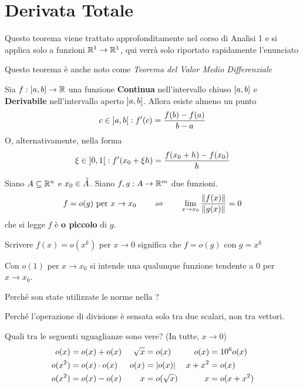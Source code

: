 \section{Derivata Totale}
\begin{theorem}[di Lagrange]\leavevmode\vspace*{-\baselineskip}
	\label{teo:lagrange}
	\begin{note}
		Questo teorema viene trattato approfonditamente nel corso di Analisi 1 e si applica solo a funzioni $\mathbb{R}^1 \to \mathbb{R}^1$, qui verrà solo riportato rapidamente l'enunciato
	\end{note}
	\begin{note}
		Questo teorema è anche noto come \textit{Teorema del Valor Medio Differenziale}
	\end{note}
	Sia $f: \left[a,b\right] \to \mathbb{R}$ una funzione \textbf{Continua} nell'intervallo chiuso $\left[a,b\right]$ e \textbf{Derivabile} nell'intervallo aperto $\left]a,b\right[$. Allora esiste almeno un punto
	\[c \in \left]a,b\right[ : f'(c) = \frac{f(b)-f(a)}{b - a}\]
	O, alternativamente, nella forma
	\[\xi \in \left]0,1\right[ : f'(x_0 + \xi h) = \frac{f(x_0 + h)-f(x_0)}{h}\]
\end{theorem}
\begin{definition}[o piccolo]
	\label{def:o_piccolo}
	Siano $A \subseteq \mathbb{R}^n$ e $x_0 \in \accentset{\circ}{A}$. Siano $f,g: A \to \mathbb{R}^m$ due funzioni.
	\[f=o(g) \text{ per } x \to x_0 \qquad \rightleftharpoons \qquad \lim\limits_{x \to x_0} \frac{\left\|f(x)\right\|}{\left\|g(x)\right\|} = 0\]
	che si legge $f$ è \textbf{o piccolo} di $g$.
	\begin{note}
		Scrivere $f(x) = o(x^k)$ per $x \to 0$ significa che $f = o(g)$ con $g = x^k$
	\end{note}
	\begin{note}
		\hypertarget{note:o_piccolo_to_0}{}
		Con $o(1)$ per $x \to x_0$ si intende una qualunque funzione tendente a $0$ per $x \to x_0$.
	\end{note}
\end{definition}
\begin{exercise}
	Perché son state utilizzate le norme nella ?
	\begin{solution}
		Perché l'operazione di divisione è sensata solo tra due scalari, non tra vettori.
	\end{solution}
\end{exercise}
\begin{exercise}
	Quali tra le seguenti uguaglianze sono vere? (In tutte, $x \to 0$)
	\begin{align*}
		o(x) &= o(x) + o(x)			&\sqrt{x} &= o(x)	&o(x) &= 10^6 o(x)\\
		o(x^2) &= o(x) \cdot o(x)	&o(x) &= \left|o(x)\right|	&x + x^2 &= o(x)\\
		o(x^2) &= o(x) - o(x)		&x &= o(\sqrt{x})	&x &= o(x + x^2)
	\end{align*}
\end{exercise}
